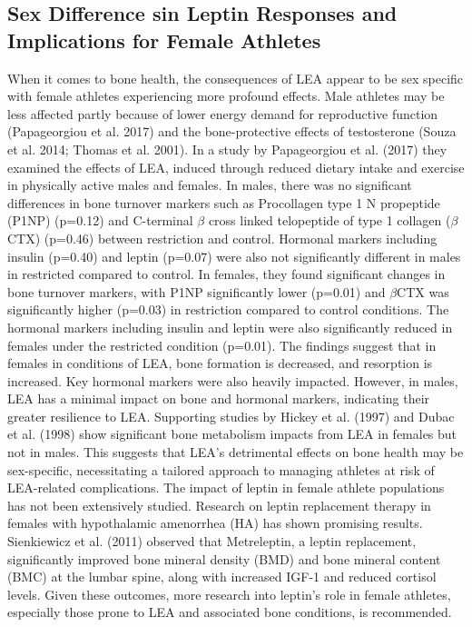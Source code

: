 \documentclass[
]{article}
\begin{document}
\subsection{Sex Difference sin Leptin Responses and Implications for Female Athletes}\label{sex-difference-sin-leptin-responses-and-implications-for-female-athletes}

When it comes to bone health, the consequences of LEA appear to be sex specific with female athletes experiencing more profound effects. Male athletes may be less affected partly because of lower energy demand for reproductive function (Papageorgiou et al. 2017) and the bone-protective effects of testosterone (Souza et al. 2014; Thomas et al. 2001). In a study by Papageorgiou et al. (2017) they examined the effects of LEA, induced through reduced dietary intake and exercise in physically active males and females. In males, there was no significant differences in bone turnover markers such as Procollagen type 1 N propeptide (P1NP) (p=0.12) and C-terminal \(\beta\) cross linked telopeptide of type 1 collagen (\(\beta\)CTX) (p=0.46) between restriction and control. Hormonal markers including insulin (p=0.40) and leptin (p=0.07) were also not significantly different in males in restricted compared to control. In females, they found significant changes in bone turnover markers, with P1NP significantly lower (p=0.01) and \(\beta\)CTX was significantly higher (p=0.03) in restriction compared to control conditions. The hormonal markers including insulin and leptin were also significantly reduced in females under the restricted condition (p=0.01). The findings suggest that in females in conditions of LEA, bone formation is decreased, and resorption is increased. Key hormonal markers were also heavily impacted. However, in males, LEA has a minimal impact on bone and hormonal markers, indicating their greater resilience to LEA. Supporting studies by Hickey et al. (1997) and Dubac et al. (1998) show significant bone metabolism impacts from LEA in females but not in males. This suggests that LEA's detrimental effects on bone health may be sex-specific, necessitating a tailored approach to managing athletes at risk of LEA-related complications.
The impact of leptin in female athlete populations has not been extensively studied. Research on leptin replacement therapy in females with hypothalamic amenorrhea (HA) has shown promising results. Sienkiewicz et al. (2011) observed that Metreleptin, a leptin replacement, significantly improved bone mineral density (BMD) and bone mineral content (BMC) at the lumbar spine, along with increased IGF-1 and reduced cortisol levels. Given these outcomes, more research into leptin's role in female athletes, especially those prone to LEA and associated bone conditions, is recommended.
\end{document}
